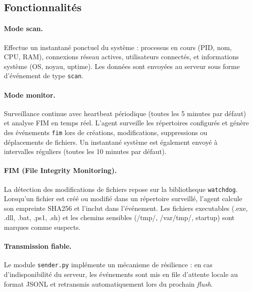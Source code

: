 \subsection{Fonctionnalités}

\paragraph{Mode scan.} Effectue un instantané ponctuel du système :
processus en cours (PID, nom, CPU, RAM), connexions réseau actives,
utilisateurs connectés, et informations système (OS, noyau, uptime).
Les données sont envoyées au serveur sous forme d'événement de type
\texttt{scan}.

\paragraph{Mode monitor.} Surveillance continue avec heartbeat périodique
(toutes les 5 minutes par défaut) et analyse FIM en temps réel.
L'agent surveille les répertoires configurés et génère des événements
\texttt{fim} lors de créations, modifications, suppressions ou
déplacements de fichiers. Un instantané système est également envoyé à
intervalles réguliers (toutes les 10 minutes par défaut).

\paragraph{FIM (File Integrity Monitoring).} La détection des
modifications de fichiers repose sur la bibliotheque \texttt{watchdog}.
Lorsqu'un fichier est créé ou modifié dans un répertoire surveillé,
l'agent calcule son empreinte SHA256 et l'inclut dans l'événement. Les
fichiers executables (.exe, .dll, .bat, .ps1, .sh) et les chemins
sensibles (/tmp/, /var/tmp/, startup) sont marques comme suspects.

\paragraph{Transmission fiable.} Le module \texttt{sender.py} implémente
un mécanisme de résilience : en cas d'indisponibilité du serveur, les
événements sont mis en file d'attente locale au format JSONL et
retransmis automatiquement lors du prochain \emph{flush}.

